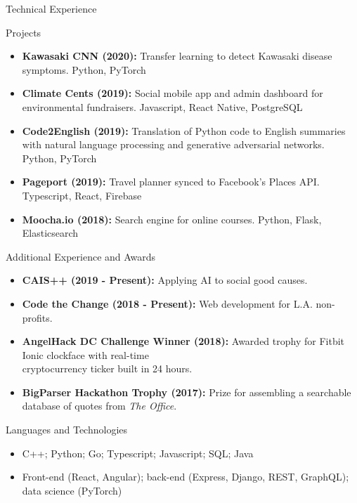 \documentclass[calibri]{mcdowellcv}
\begin{document}
\begin{cvsection}{Technical Experience}
	\begin{cvsubsection}{Projects}{}{}
		\begin{itemize}
			\item \textbf{Kawasaki CNN (2020):} Transfer learning to detect Kawasaki disease symptoms. Python, PyTorch
			\item \textbf{Climate Cents (2019):} Social mobile app and admin dashboard for environmental fundraisers. Javascript, React Native, PostgreSQL
			\item \textbf{Code2English (2019):} Translation of Python code to English summaries with natural language processing and generative adversarial networks. Python, PyTorch
			\item \textbf{Pageport (2019):} Travel planner synced to Facebook's Places API. Typescript, React, Firebase
			\item \textbf{Moocha.io (2018):} Search engine for online courses. Python, Flask, Elasticsearch
		\end{itemize}
	\end{cvsubsection}
\end{cvsection}

\begin{cvsection}{Additional Experience and Awards}
	\begin{cvsubsection}{}{}{}
		\begin{itemize}
			\item \textbf{CAIS++ (2019 - Present):} Applying AI to social good causes.
			\item \textbf{Code the Change (2018 - Present):} Web development for L.A. non-profits.
			\item \textbf{AngelHack DC Challenge Winner (2018):} Awarded trophy for Fitbit Ionic clockface with real-time \\cryptocurrency ticker built in 24 hours.
			\item \textbf{BigParser Hackathon Trophy (2017):} Prize for assembling a searchable database of quotes from \textit{The Office}.
		\end{itemize}
	\end{cvsubsection}
\end{cvsection}

\begin{cvsection}{Languages and Technologies}
	\begin{cvsubsection}{}{}{}
		\begin{itemize}
			\item C++; Python; Go; Typescript; Javascript; SQL; Java
			\item Front-end (React, Angular); back-end (Express, Django, REST, GraphQL); data science (PyTorch)
		\end{itemize}
	\end{cvsubsection}
\end{cvsection}
\end{document}
